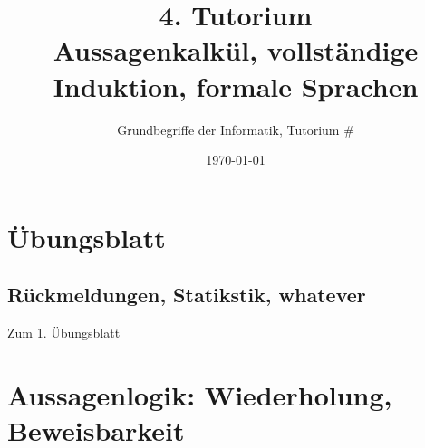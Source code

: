



\title[Aussagenkalkül, vollständige Induktion, formale Sprachen]{4. Tutorium\\ Aussagenkalkül, vollständige Induktion, formale Sprachen}
\subtitle{Grundbegriffe der Informatik, Tutorium \#\mytutnumber}
\date{\today}


\titleframe
\roadmap

\section*{Übungsblatt}
\subsection{Rückmeldungen, Statikstik, whatever}
	\begin{frame}{Zum 1. Übungsblatt}
	\end{frame}

\section[Aussagenlogik]{Aussagenlogik: Wiederholung, Beweisbarkeit}
